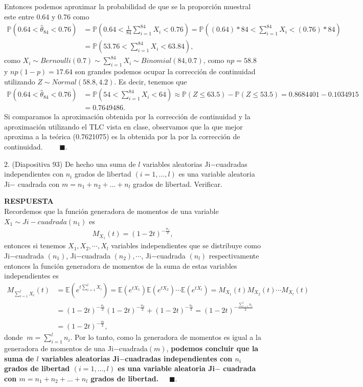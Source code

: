 \documentclass[11pt,letterpaper]{article}
\newcommand{\mP}{\mathbb{P}}
\newcommand{\mE}{\mathbb{E}}
\newcommand{\res}{\textbf{RESPUESTA}\\}
\newcommand{\fin}{$\blacksquare.$}
\begin{document}
Entonces podemos aproximar la probabilidad de que se la proporción muestral este entre 0.64 y 0.76 como
\begin{align*}
\mP(0.64 < \hat{\theta}_{84}<0.76)&=\mP(0.64 < \frac{1}{84}\sum_{i=1}^{84}X_i<0.76)=\mP((0.64)*84 <\sum_{i=1}^{84}X_i<(0.76)*84)\\
&=\mP(53.76 <\sum_{i=1}^{84}X_i<63.84),
\end{align*} 
como $X_i\sim Bernoulli(0.7)\sim \sum_{i=1}^{84}X_i\sim Binomial(84,0.7)$, como $np=58.8$ y $np(1-p)=17.64$ son grandes podemos ocupar la corrección de continuidad utilizando $Z\sim Normal(58.8,4.2)$. Es decir, tenemos que 
\begin{align*}
\mP(0.64 < \hat{\theta}_{84}<0.76)&= \mP(54 <\sum_{i=1}^{84}X_i<64) \approx \mP(Z\leq 63.5)- \mP(Z\leq 53.5)=0.8684401-0.1034915\\
&=0.7649486.
\end{align*}
Si comparamos la aproximación obtenida por la corrección de continuidad y la aproximación utilizando el TLC vista en clase, observamos que la que mejor aproxima a la teórica (0.7621075) es la obtenida por la por la corrección de continuidad. \ \ \ \ \fin 

2. (Diapositiva 93) De hecho una suma de $l$ variables aleatorias Ji$-$cuadradas independientes con $n_i$ grados de libertad $(i = 1, . . . , l)$ es una variable aleatoria Ji$-$ cuadrada con $m = n_1 + n_2 + . . . + n_l$ grados de libertad. Verificar.

\res Recordemos que la función generadora de momentos de una variable $X_1\sim Ji-cuadrada(n_1)$ es
\begin{align*}
M_{X_1}(t)= (1-2t)^{-\frac{n_1}{2}},
\end{align*}
entonces si tenemos $X_1, X_2, \cdots , X_l$  variables independientes que se distribuye como Ji$-$cuadrada $(n_1)$, Ji$-$cuadrada $(n_2), \cdots$, Ji$-$cuadrada $(n_l)$ respectivamente entonces la función generadora de momentos de la suma de estas variables independientes es
\begin{align*}
M_{\sum_{i=1}^l X_i} (t)&=\mE\left(e^{t\sum_{i=1}^l X_i} \right)=\mE\left(e^{tX_1} \right)\mE\left(e^{tX_2} \right)\cdots \mE\left(e^{tX_l} \right)=M_{X_1}(t)M_{X_2}(t)\cdots M_{X_l}(t)\\
&=(1-2t)^{-\frac{n_1}{2}}(1-2t)^{-\frac{n_2}{2}}+(1-2t)^{-\frac{n_l}{2}}=(1-2t)^{-\frac{\sum_{i=1}^l n_i}{2}}\\ \\
&=(1-2t)^{-\frac{m}{2}}, 
\end{align*}
donde $\ m =\sum_{i=1}^l n_i$. Por lo tanto, como la generadora de momentos es igual a la generadora de momentos de una Ji$-$cuadrada$(m)$, \textbf{podemos concluir que la suma de $l$ variables aleatorias Ji$-$cuadradas independientes con $n_i$ grados de libertad $(i = 1, . . . , l)$ es una variable aleatoria Ji$-$ cuadrada con $m = n_1 + n_2 + . . . + n_l$ grados de libertad.}\ \ \ \fin
\end{document}
